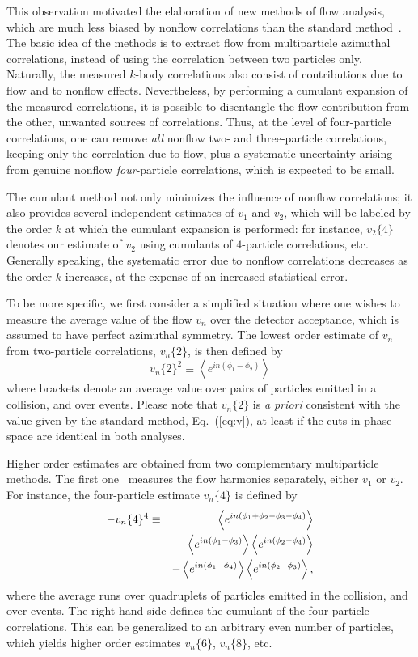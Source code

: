 \documentclass[aps,prc,superscriptaddress,showpacs,floatfix,nofootinbib]{revtex4}
\newcommand{\mean}[1]{\left\langle #1 \right\rangle}
\begin{document}
This observation motivated the elaboration of new methods of flow
analysis, which are much less biased by nonflow correlations than the
standard method~\cite{Borghini:2000sa}.  The basic idea of the methods
is to extract flow from multiparticle azimuthal correlations, instead
of using the correlation between two particles only.  Naturally, the
measured $k$-body correlations also consist of contributions due to
flow and to nonflow effects.  Nevertheless, by performing a cumulant
expansion of the measured correlations, it is possible to disentangle
the flow contribution from the other, unwanted sources of
correlations.  Thus, at the level of four-particle correlations, one
can remove {\em all} nonflow two- and three-particle correlations,
keeping only the correlation due to flow, plus a systematic
uncertainty arising from genuine nonflow {\em four}-particle
correlations, which is expected to be small.

The cumulant method not only minimizes the influence of nonflow
correlations; it also provides several independent estimates of $v_1$
and $v_2$, which will be labeled by the order $k$ at which the
cumulant expansion is performed: for instance, $v_2\{4\}$ denotes our
estimate of $v_2$ using cumulants of $4$-particle correlations, etc.
Generally speaking, the systematic error due to nonflow correlations
decreases as the order $k$ increases, at the expense of an increased
statistical error.

To be more specific, we first consider a simplified situation where
one wishes to measure the average value of the flow $v_n$ over the
detector acceptance, which is assumed to have perfect azimuthal
symmetry.  The lowest order estimate of $v_n$ from two-particle
correlations, $v_n\{2\}$, is then defined by
\begin{equation}
\label{eq:vn2}
v_n\{2\}^2\equiv \mean{e^{in(\phi_1-\phi_2)}}
\end{equation}
where brackets denote an average value over pairs of particles emitted
in a collision, and over events.  Please note that $v_n\{2\}$ is {\em
a priori} consistent with the value given by the standard method,
Eq.~(\ref{eq:v}), at least if the cuts in phase space are identical in
both analyses.

Higher order estimates are obtained from two complementary
multiparticle methods.  The first one~\cite{Borghini:2001vi} measures
the flow harmonics separately, either $v_1$ or $v_2$.  For instance,
the four-particle estimate $v_n\{4\}$ is defined by
\begin{eqnarray}
\label{eq:vn4}
-v_n\{4\}^4 &\equiv& \mean{e^{in(\phi_1+\phi_2-\phi_3-\phi_4)}} \cr
 & &-\mean{e^{in(\phi_1-\phi_3)}}\mean{e^{in(\phi_2-\phi_4)}} \cr
 & &-\mean{e^{in(\phi_1-\phi_4)}}\mean{e^{in(\phi_2-\phi_3)}},
\end{eqnarray}
where the average runs over quadruplets of particles emitted in the
collision, and over events.  The right-hand side defines the cumulant
of the four-particle correlations.  This can be generalized to an
arbitrary even number of particles, which yields higher order
estimates $v_n\{6\}$, $v_n\{8\}$, etc.
\end{document}
